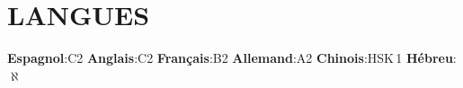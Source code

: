 \section{LANGUES}
\begin{itemize}[leftmargin=0in, label={}]
  \small{\item{
    \textbf{Espagnol}\hspace{2pt}:\hspace{4pt}C2\hspace{12pt}
    \textbf{Anglais}\hspace{2pt}:\hspace{4pt}C2\hspace{12pt}
    \textbf{Français}\hspace{2pt}:\hspace{4pt}B2\hspace{12pt}
    \textbf{Allemand}\hspace{2pt}:\hspace{4pt}A2\hspace{12pt}
    \textbf{Chinois}\hspace{2pt}:\hspace{4pt}HSK\,1\hspace{12pt}
    \textbf{Hébreu}\hspace{2pt}:\hspace{4pt}$\aleph$
  }}
\end{itemize}
